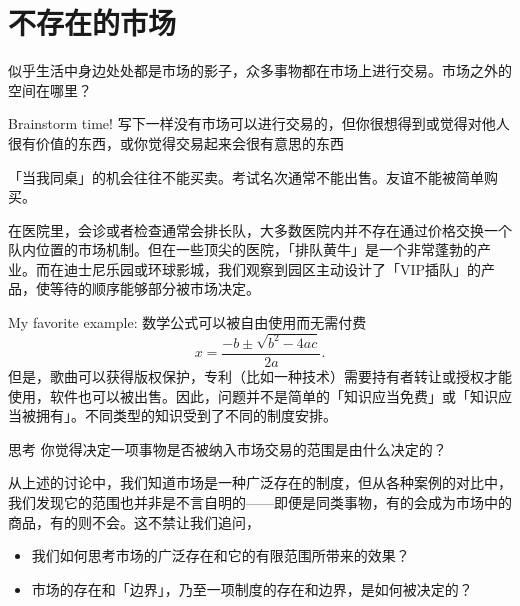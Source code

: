 \documentclass[UTF8,10pt,a4paper,scheme=chinese,fontset=none]{ctexart}
\begin{document}

\section{不存在的市场}

似乎生活中身边处处都是市场的影子，众多事物都在市场上进行交易。市场之外的空间在哪里？

\begin{discussionbox}{Brainstorm time!}
  写下一样没有市场可以进行交易的，但你很想得到或觉得对他人很有价值的东西，或你觉得交易起来会很有意思的东西
\end{discussionbox}

「当我同桌」的机会往往不能买卖。考试名次通常不能出售。友谊不能被简单购买。

在医院里，会诊或者检查通常会排长队，大多数医院内并不存在通过价格交换一个队内位置的市场机制。但在一些顶尖的医院，「排队黄牛」是一个非常蓬勃的产业。而在迪士尼乐园或环球影城，我们观察到园区主动设计了「VIP插队」的产品，使等待的顺序能够部分被市场决定。

My favorite example: 数学公式可以被自由使用而无需付费
\[
 x = \frac{-b \pm \sqrt{b^2 - 4ac}}{2a}.
\]
但是，歌曲可以获得版权保护，专利（比如一种技术）需要持有者转让或授权才能使用，软件也可以被出售。因此，问题并不是简单的「知识应当免费」或「知识应当被拥有」。不同类型的知识受到了不同的制度安排。

\begin{discussionbox}{思考}
  你觉得决定一项事物是否被纳入市场交易的范围是由什么决定的？
\end{discussionbox}


从上述的讨论中，我们知道市场是一种广泛存在的制度，但从各种案例的对比中，我们发现它的范围也并非是不言自明的——即便是同类事物，有的会成为市场中的商品，有的则不会。这不禁让我们追问，
\begin{itemize}
  \item 我们如何思考市场的广泛存在和它的有限范围所带来的效果？
  \item 市场的存在和「边界」，乃至一项制度的存在和边界，是如何被决定的？
\end{itemize}
\end{document}
